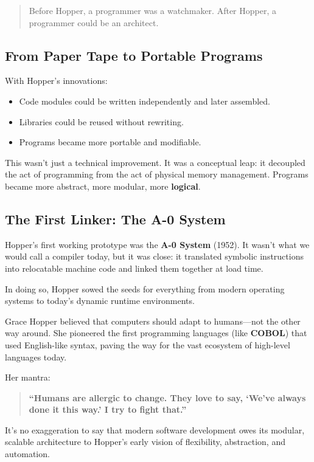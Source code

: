 \begin{quote} Before Hopper, a programmer was a watchmaker.
After Hopper, a programmer could be an architect. \end{quote}

\subsection{From Paper Tape to Portable Programs}

With Hopper's innovations:

\begin{itemize} \item Code modules could be written independently and later assembled. \item Libraries could be reused without rewriting. \item Programs became more portable and modifiable. \end{itemize}

This wasn’t just a technical improvement. It was a conceptual leap: it decoupled the act of programming from the act of physical memory management. Programs became more abstract, more modular, more \textbf{logical}.

\subsection{The First Linker: The A-0 System}

Hopper’s first working prototype was the \textbf{A-0 System} (1952). It wasn’t what we would call a compiler today, but it was close: it translated symbolic instructions into relocatable machine code and linked them together at load time.

In doing so, Hopper sowed the seeds for everything from modern operating systems to today's dynamic runtime environments.

\begin{tcolorbox}[colback=gray!5!white,colframe=black!75!white,title=Historical Sidebar: Grace Hopper’s Programming Philosophy,fonttitle=\bfseries]

Grace Hopper believed that computers should adapt to humans—not the other way around.
She pioneered the first programming languages (like \textbf{COBOL}) that used English-like syntax, paving the way for the vast ecosystem of high-level languages today.

Her mantra: \begin{quote} \textbf{``Humans are allergic to change. They love to say, ‘We’ve always done it this way.’ I try to fight that.''} \end{quote}

It’s no exaggeration to say that modern software development owes its modular, scalable architecture to Hopper’s early vision of flexibility, abstraction, and automation.

\end{tcolorbox}

